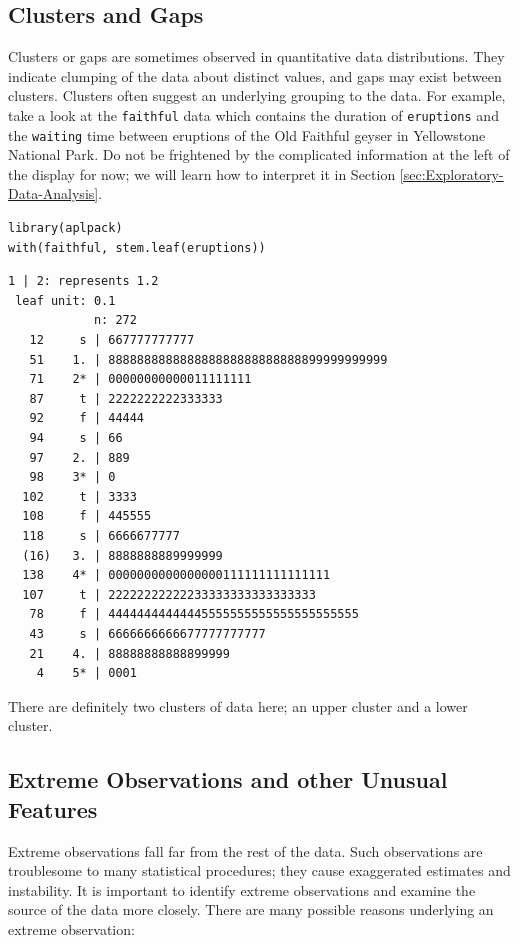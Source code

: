 \documentclass[captions=tableheading]{scrbook}
\begin{document}
\subsection{Clusters and Gaps}
\label{sec-2-2-4}

\label{sub:clusters-and-gaps}

Clusters or gaps are sometimes observed in quantitative data distributions. They indicate clumping of the data about distinct values, and gaps may exist between clusters. Clusters often suggest an underlying grouping to the data. For example, take a look at the \texttt{faithful} data which contains the duration of \texttt{eruptions} and the \texttt{waiting} time between eruptions of the Old Faithful geyser in Yellowstone National Park. Do not be frightened by the complicated information at the left of the display for now; we will learn how to interpret it in Section \ref{sec:Exploratory-Data-Analysis}.


\begin{verbatim}
library(aplpack)
with(faithful, stem.leaf(eruptions))
\end{verbatim}


\begin{verbatim}
1 | 2: represents 1.2
 leaf unit: 0.1
            n: 272
   12     s | 667777777777
   51    1. | 888888888888888888888888888899999999999
   71    2* | 00000000000011111111
   87     t | 2222222222333333
   92     f | 44444
   94     s | 66
   97    2. | 889
   98    3* | 0
  102     t | 3333
  108     f | 445555
  118     s | 6666677777
  (16)   3. | 8888888889999999
  138    4* | 0000000000000000111111111111111
  107     t | 22222222222233333333333333333
   78     f | 44444444444445555555555555555555555
   43     s | 6666666666677777777777
   21    4. | 88888888888899999
    4    5* | 0001
\end{verbatim}

There are definitely two clusters of data here; an upper cluster and a lower cluster. 
\subsection{Extreme Observations and other Unusual Features}
\label{sec-2-2-5}

\label{sub:Extreme-Observations-and}

Extreme observations fall far from the rest of the data. Such observations are troublesome to many statistical procedures; they cause exaggerated estimates and instability. It is important to identify extreme observations and examine the source of the data more closely. There are many possible reasons underlying an extreme observation:
\end{document}
